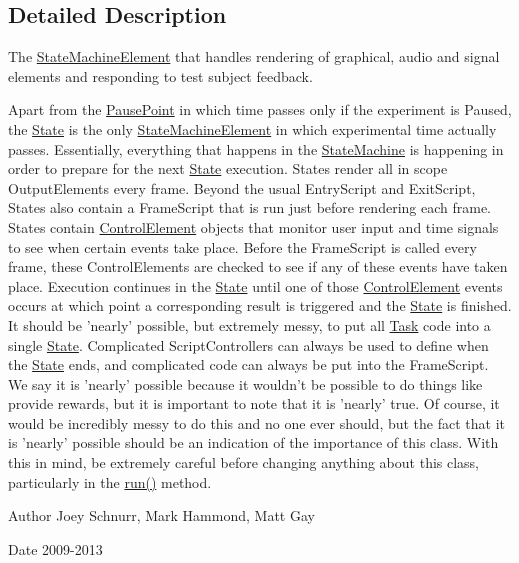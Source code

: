 \subsection{Detailed Description}
The \hyperlink{class_picto_1_1_state_machine_element}{State\-Machine\-Element} that handles rendering of graphical, audio and signal elements and responding to test subject feedback. 

Apart from the \hyperlink{class_picto_1_1_pause_point}{Pause\-Point} in which time passes only if the experiment is Paused, the \hyperlink{class_picto_1_1_state}{State} is the only \hyperlink{class_picto_1_1_state_machine_element}{State\-Machine\-Element} in which experimental time actually passes. Essentially, everything that happens in the \hyperlink{class_picto_1_1_state_machine}{State\-Machine} is happening in order to prepare for the next \hyperlink{class_picto_1_1_state}{State} execution. States render all in scope Output\-Elements every frame. Beyond the usual Entry\-Script and Exit\-Script, States also contain a Frame\-Script that is run just before rendering each frame. States contain \hyperlink{class_picto_1_1_control_element}{Control\-Element} objects that monitor user input and time signals to see when certain events take place. Before the Frame\-Script is called every frame, these Control\-Elements are checked to see if any of these events have taken place. Execution continues in the \hyperlink{class_picto_1_1_state}{State} until one of those \hyperlink{class_picto_1_1_control_element}{Control\-Element} events occurs at which point a corresponding result is triggered and the \hyperlink{class_picto_1_1_state}{State} is finished. It should be 'nearly' possible, but extremely messy, to put all \hyperlink{class_picto_1_1_task}{Task} code into a single \hyperlink{class_picto_1_1_state}{State}. Complicated Script\-Controllers can always be used to define when the \hyperlink{class_picto_1_1_state}{State} ends, and complicated code can always be put into the Frame\-Script. We say it is 'nearly' possible because it wouldn't be possible to do things like provide rewards, but it is important to note that it is 'nearly' true. Of course, it would be incredibly messy to do this and no one ever should, but the fact that it is 'nearly' possible should be an indication of the importance of this class. With this in mind, be extremely careful before changing anything about this class, particularly in the \hyperlink{class_picto_1_1_state_abd02d3ab244f4ff544e916b577c97213}{run()} method. \begin{DoxyAuthor}{Author}
Joey Schnurr, Mark Hammond, Matt Gay 
\end{DoxyAuthor}
\begin{DoxyDate}{Date}
2009-\/2013 
\end{DoxyDate}



